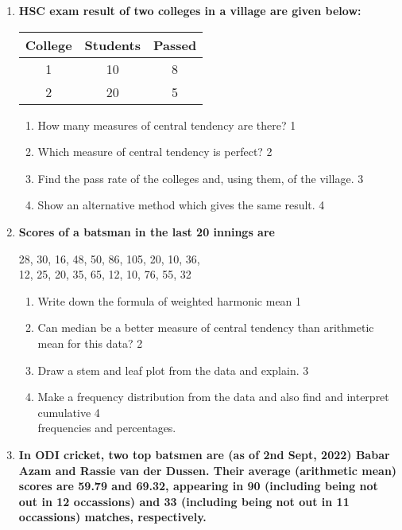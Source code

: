 \documentclass[a4paper,oneside]{book}
\begin{document}
\begin{enumerate}
 \item
	  \textbf{HSC exam result of two colleges in a village are given below:} 
	  
	  \begin{table}[h]
	  \centering
\begin{tabular}{c|c|c}
College & Students & Passed \\ \hline
1 & 10 & 8 \\ \hline
2 & 20 & 5
\end{tabular}
\end{table}
  
  \begin{enumerate}
    \item
	How many measures of central tendency are there? \hfill 1
    \item
	Which measure of central tendency is perfect? \hfill 2
    \item  
	Find the pass rate of the colleges and, using them, of the village. \hfill 3
    \item
	Show an alternative method which gives the same result. \hfill 4
  \end{enumerate}

      \item
  \textbf{Scores of a batsman in the last 20 innings are} 
   \begin{center}
  	 28, 30, 16, 48, 50, 86, 105, 20, 10, 36, \\
  	 12, 25, 20, 35, 65, 12, 10, 76, 55, 32
  	 \end{center}
  \begin{enumerate}
    \item
	Write down the formula of weighted harmonic mean \hfill 1
    \item
	Can median be a better measure of central tendency than arithmetic mean for this data?  \hfill 2
    \item  
	Draw a stem and leaf plot from the data and explain.  \hfill 3
    \item
	Make a frequency distribution from the data and also find and interpret cumulative  \hfill 4 \\ frequencies and percentages.
\end{enumerate}

 \item
	  \textbf{In ODI cricket, two top batsmen are (as of 2nd Sept, 2022) Babar Azam and Rassie van der Dussen. Their average (arithmetic mean) scores are 59.79 and 69.32, appearing in 90 (including being not out in 12 occassions) and 33 (including being not out in 11 occassions) matches, respectively.} 
  

\end{enumerate}
\end{document}
